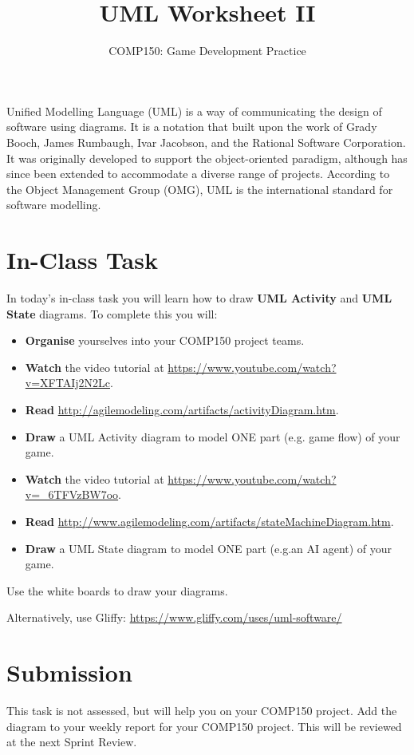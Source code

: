 \documentclass{scrartcl}
\begin{document}
\title{UML Worksheet II}
\author{COMP150: Game Development Practice}
\date{}

\maketitle

Unified Modelling Language (UML) is a way of communicating the design of software using diagrams. It is a notation that built upon the work of Grady Booch, James Rumbaugh, Ivar Jacobson, and the Rational Software Corporation. It was originally developed to support the object-oriented paradigm, although has since been extended to accommodate a diverse range of projects. According to the Object Management Group (OMG), UML is the international standard for software modelling.

\section{In-Class Task}

In today's in-class task you will learn how to draw \textbf{UML Activity} and \textbf{UML State} diagrams. To complete this you will:

\begin{itemize}
	\item \textbf{Organise} yourselves into your COMP150 project teams.
	\item \textbf{Watch} the video tutorial at \url{https://www.youtube.com/watch?v=XFTAIj2N2Lc}.
	\item \textbf{Read} \url{http://agilemodeling.com/artifacts/activityDiagram.htm}.
	\item \textbf{Draw} a UML Activity diagram to model ONE part (e.g. game flow) of your game.
	\item \textbf{Watch} the video tutorial at \url{https://www.youtube.com/watch?v=_6TFVzBW7oo}.
	\item \textbf{Read} \url{http://www.agilemodeling.com/artifacts/stateMachineDiagram.htm}.
	\item \textbf{Draw} a UML State diagram to model ONE part (e.g.an AI agent) of your game.
\end{itemize}

\vspace{1ex}

Use the white boards to draw your diagrams.
 
Alternatively, use Gliffy: \url{https://www.gliffy.com/uses/uml-software/}

\section{Submission}

 This task is not assessed, but will help you on your COMP150 project. Add the diagram to your weekly report for your COMP150 project. This will be reviewed at the next Sprint Review.
\end{document}

